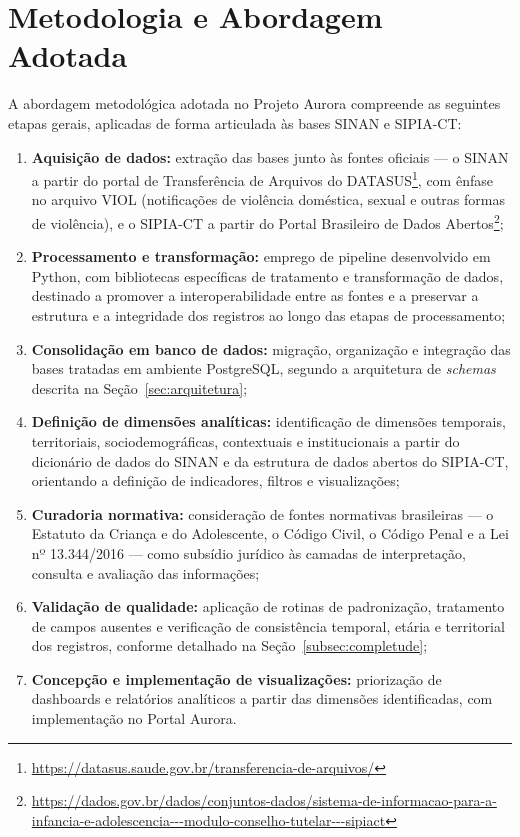 \documentclass[11pt,a4paper]{article}
\begin{document}
\section{Metodologia e Abordagem Adotada}
\label{sec:metodologia}

A abordagem metodológica adotada no Projeto Aurora compreende as seguintes etapas gerais, aplicadas de forma articulada às bases SINAN e SIPIA-CT:

\begin{enumerate}
  \item \textbf{Aquisição de dados:} extração das bases junto às fontes oficiais — o SINAN a partir do portal de Transferência de Arquivos do DATASUS\footnote{\url{https://datasus.saude.gov.br/transferencia-de-arquivos/}}, com ênfase no arquivo VIOL (notificações de violência doméstica, sexual e outras formas de violência), e o SIPIA-CT a partir do Portal Brasileiro de Dados Abertos\footnote{\label{fn:dadosgov}\url{https://dados.gov.br/dados/conjuntos-dados/sistema-de-informacao-para-a-infancia-e-adolescencia---modulo-conselho-tutelar---sipiact}};
  \item \textbf{Processamento e transformação:} emprego de pipeline desenvolvido em Python, com bibliotecas específicas de tratamento e transformação de dados, destinado a promover a interoperabilidade entre as fontes e a preservar a estrutura e a integridade dos registros ao longo das etapas de processamento;
  \item \textbf{Consolidação em banco de dados:} migração, organização e integração das bases tratadas em ambiente PostgreSQL, segundo a arquitetura de \emph{schemas} descrita na Seção~\ref{sec:arquitetura};
  \item \textbf{Definição de dimensões analíticas:} identificação de dimensões temporais, territoriais, sociodemográficas, contextuais e institucionais a partir do dicionário de dados do SINAN e da estrutura de dados abertos do SIPIA-CT, orientando a definição de indicadores, filtros e visualizações;
  \item \textbf{Curadoria normativa:} consideração de fontes normativas brasileiras — o Estatuto da Criança e do Adolescente, o Código Civil, o Código Penal e a Lei nº 13.344/2016 — como subsídio jurídico às camadas de interpretação, consulta e avaliação das informações;
  \item \textbf{Validação de qualidade:} aplicação de rotinas de padronização, tratamento de campos ausentes e verificação de consistência temporal, etária e territorial dos registros, conforme detalhado na Seção~\ref{subsec:completude};
  \item \textbf{Concepção e implementação de visualizações:} priorização de dashboards e relatórios analíticos a partir das dimensões identificadas, com implementação no Portal Aurora.
\end{enumerate}
\end{document}

